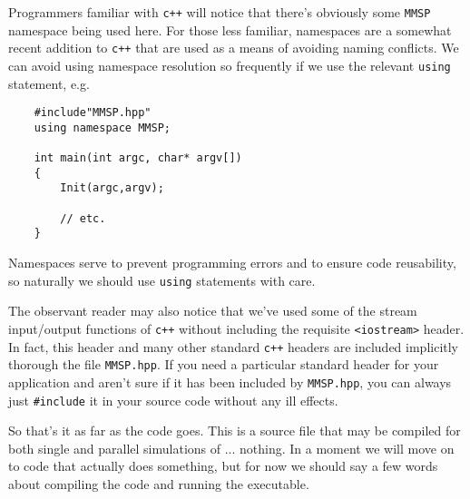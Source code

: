 Programmers familiar with {\tt c++} will notice that there's obviously some {\tt MMSP} namespace being used here.  For those less familiar, namespaces are a somewhat recent addition to {\tt c++} that are used as a means of avoiding naming conflicts.  We can avoid using namespace resolution so frequently if we use the relevant {\tt using} statement, e.g. 
\begin{shadebox}
\begin{verbatim}
    #include"MMSP.hpp"
    using namespace MMSP;

    int main(int argc, char* argv[])
    {
        Init(argc,argv);

        // etc. 
    }
\end{verbatim}
\end{shadebox}
Namespaces serve to prevent programming errors and to ensure code reusability, so naturally we should use {\tt using} statements with care.

The observant reader may also notice that we've used some of the stream input/output functions of {\tt c++} without including the requisite {\tt <iostream>} header.  In fact, this header and many other standard {\tt c++} headers are included implicitly thorough the file {\tt MMSP.hpp}.  If you need a particular standard header for your application and aren't sure if it has been included by {\tt MMSP.hpp}, you can always just {\tt \#include} it in your source code without any ill effects.

So that's it as far as the code goes.  This is a source file that may be compiled for both single and parallel simulations of ... nothing.  In a moment we will move on to code that actually does something, but for now we should say a few words about compiling the code and running the executable.

